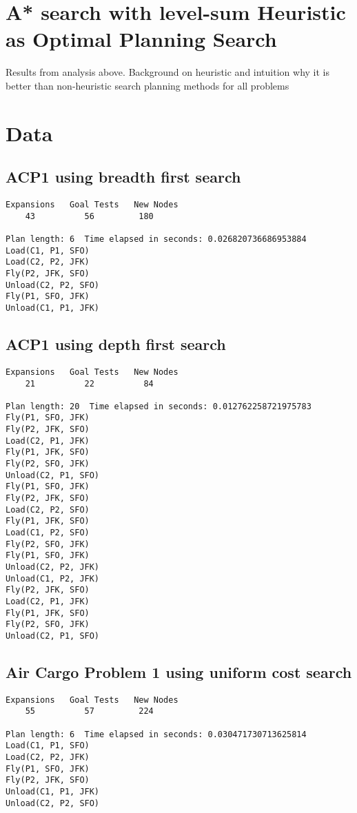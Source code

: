 \documentclass[11pt,a4paper]{report}
\begin{document}
\section*{A* search with level-sum Heuristic as Optimal Planning Search}
Results from analysis above. Background on heuristic and intuition why it is  better than non-heuristic search planning methods for all problems
\section*{Data}
\subsection*{ ACP1 using breadth first search}
\begin{verbatim}
Expansions   Goal Tests   New Nodes
    43          56         180

Plan length: 6  Time elapsed in seconds: 0.026820736686953884
Load(C1, P1, SFO)
Load(C2, P2, JFK)
Fly(P2, JFK, SFO)
Unload(C2, P2, SFO)
Fly(P1, SFO, JFK)
Unload(C1, P1, JFK)
\end{verbatim}

\subsection*{ ACP1 using depth first search}
\begin{verbatim}
Expansions   Goal Tests   New Nodes
    21          22          84

Plan length: 20  Time elapsed in seconds: 0.012762258721975783
Fly(P1, SFO, JFK)
Fly(P2, JFK, SFO)
Load(C2, P1, JFK)
Fly(P1, JFK, SFO)
Fly(P2, SFO, JFK)
Unload(C2, P1, SFO)
Fly(P1, SFO, JFK)
Fly(P2, JFK, SFO)
Load(C2, P2, SFO)
Fly(P1, JFK, SFO)
Load(C1, P2, SFO)
Fly(P2, SFO, JFK)
Fly(P1, SFO, JFK)
Unload(C2, P2, JFK)
Unload(C1, P2, JFK)
Fly(P2, JFK, SFO)
Load(C2, P1, JFK)
Fly(P1, JFK, SFO)
Fly(P2, SFO, JFK)
Unload(C2, P1, SFO)
\end{verbatim}





\subsection*{ Air Cargo Problem 1 using uniform cost search}
\begin{verbatim}
Expansions   Goal Tests   New Nodes
    55          57         224

Plan length: 6  Time elapsed in seconds: 0.030471730713625814
Load(C1, P1, SFO)
Load(C2, P2, JFK)
Fly(P1, SFO, JFK)
Fly(P2, JFK, SFO)
Unload(C1, P1, JFK)
Unload(C2, P2, SFO)

\end{verbatim}
\end{document}

